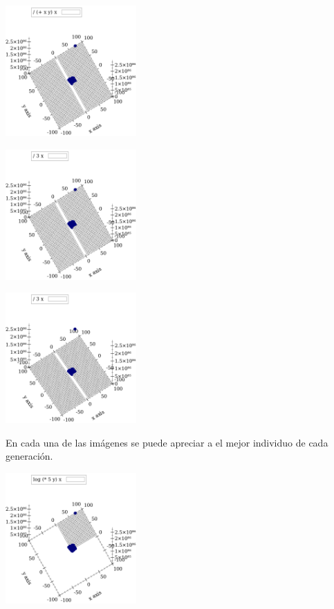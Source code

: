 \documentclass[10pt,a4paper]{article}
\begin{document}
\begin{center}
\includegraphics[width=5cm, height=5cm]{13}
\begin{center}
\includegraphics[width=5cm, height=5cm]{12}
\end{center}
\begin{center}
\includegraphics[width=5cm, height=5cm]{11}
\end{center}
En cada una de las imágenes se puede apreciar a el mejor individuo de cada generación.\\
\begin{center}
\includegraphics[width=5cm, height=5cm]{10}

\end{center}
\end{center}
\end{document}
